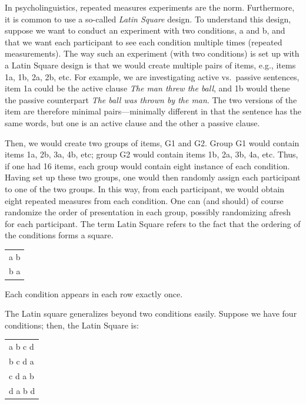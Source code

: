 \documentclass[12pt,]{krantz}
\begin{document}
In psycholinguistics, repeated measures experiments are the norm. Furthermore, it is common to use a so-called \emph{Latin Square} design. To understand this design, suppose we want to conduct an experiment with two conditions, a and b, and that we want each participant to see each condition multiple times (repeated measurements). The way such an experiment (with two conditions) is set up with a Latin Square design is that we would create multiple pairs of items, e.g., items 1a, 1b, 2a, 2b, etc. For example, we are investigating active vs.~passive sentences, item 1a could be the active clause \emph{The man threw the ball}, and 1b would thene the passive counterpart \emph{The ball was thrown by the man}. The two versions of the item are therefore minimal pairs---minimally different in that the sentence has the same words, but one is an active clause and the other a passive clause.

Then, we would create two groups of items, G1 and G2. Group G1 would contain items 1a, 2b, 3a, 4b, etc; group G2 would contain items 1b, 2a, 3b, 4a, etc. Thus, if one had 16 items, each group would contain eight instance of each condition. Having set up these two groups, one would then randomly assign each participant to one of the two groups. In this way, from each participant, we would obtain eight repeated measures from each condition. One can (and should) of course randomize the order of presentation in each group, possibly randomizing afresh for each participant. The term Latin Square refers to the fact that the ordering of the conditions forms a square.

\begin{longtable}[]{@{}l@{}}
\toprule
\endhead
\textbar{} a \textbar{} b \textbar{}\tabularnewline
\textbar{} b \textbar{} a \textbar{}\tabularnewline
\bottomrule
\end{longtable}

Each condition appears in each row exactly once.

The Latin square generalizes beyond two conditions easily. Suppose we have four conditions; then, the Latin Square is:

\begin{longtable}[]{@{}l@{}}
\toprule
\endhead
\textbar{} a \textbar{} b \textbar{} c \textbar{} d \textbar{}\tabularnewline
\textbar{} b \textbar{} c \textbar{} d \textbar{} a \textbar{}\tabularnewline
\textbar{} c \textbar{} d \textbar{} a \textbar{} b \textbar{}\tabularnewline
\textbar{} d \textbar{} a \textbar{} b \textbar{} d \textbar{}\tabularnewline
\bottomrule
\end{longtable}
\end{document}
